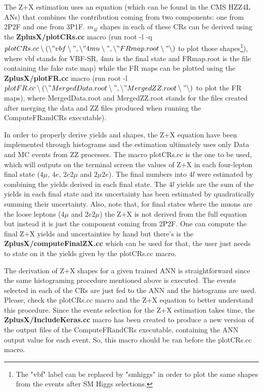 \documentclass[]{report}
\begin{document}
The Z+X estimation uses an equation (which can be found in the CMS HZZ4L ANs) that combines the contribution coming from two components: one from 2P2F and one from 3P1F. $m_{4l}$ shapes in each of these CRs can be derived using the \textbf{ZplusX/plotCRs.cc} macro (run root -l -q $plotCRs.cc\setminus(\setminus"vbf\setminus",\setminus"4mu\setminus",\setminus"FRmap.root\setminus"\setminus)$ to plot those shapes\footnote{The "vbf" label can be replaced by "smhiggs" in order to plot the same shapes from the events after SM Higgs selections.}), where vbf stands for VBF-SR, 4mu is the final state and FRmap.root is the file containing the fake rate map) while the FR maps can be plotted using the \textbf{ZplusX/plotFR.cc} macro (run root -l $plotFR.cc\setminus(\setminus"MergedData.root\setminus",\setminus"MergedZZ.root\setminus"\setminus)$ to plot the FR maps), where MergedData.root and MergedZZ.root stands for the files created after merging the data and ZZ files produced when running the ComputeFRandCRs executable). 

In order to properly derive yields and shapes, the Z+X equation have been implemented through histograms and the estimation ultimately uses only Data and MC events from ZZ processes. The macro plotCRs.cc is the one to be used, which will outputs on the terminal screen the values of Z+X in each four-lepton final state ($4\mu$, $4e$, $2e2\mu$ and $2\mu2e$). The final numbers into $4l$ were estimated by combining the yields derived in each final state. The $4l$ yields are the sum of the yields in each final state and its uncertainty has been estimated by quadratically summing their uncertainty. Also, note that, for final states where the muons are the loose leptons ($4\mu$ and $2e2\mu$) the Z+X is not derived from the full equation but instead it is just the component coming from 2P2F. One can compute the final Z+X yields and uncertainties by hand but there's is the \textbf{ZplusX/computeFinalZX.cc} which can be used for that, the user just needs to state on it the yields given by the plotCRs.cc macro.

The derivation of Z+X shapes for a given trained ANN is straightforward since the same histograming procedure mentioned above is executed. The events selected in each of the CRs are just fed to the ANN and the histograms are used. Please, check the plotCRs.cc macro and the Z+X equation to better understand this procedure. Since the events selection for the Z+X estimation takes time, the \textbf{ZplusX/IncludeKeras.cc} macro has been created to produce a new version of the output files of the ComputeFRandCRs executable, containing the ANN output value for each event. So, this macro should be ran before the plotCRs.cc macro. 
\end{document}
